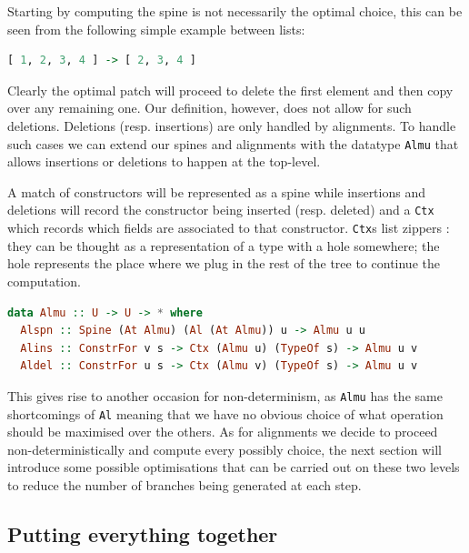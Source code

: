 \documentclass[11pt]{article}
\begin{document}
Starting by computing the spine is not necessarily the optimal choice, this can 
be seen from the following simple example between lists:

\begin{lstlisting}[language=haskell]
  [ 1, 2, 3, 4 ] -> [ 2, 3, 4 ]
\end{lstlisting}
Clearly the optimal patch will proceed to delete the first element and then 
copy over any remaining one. Our definition, however, does not allow for such 
deletions. Deletions (resp. insertions) are only handled by alignments. To 
handle such cases we can extend our spines and alignments with the datatype 
\texttt{Almu} that allows insertions or deletions to happen at the top-level.

A match of constructors will be represented as a spine while insertions and 
deletions will record the constructor being inserted (resp. deleted) and a 
\texttt{Ctx} which records which fields are associated to that constructor.
\texttt{Ctx}s list zippers \cite{zippers}: they can be thought as a representation 
of a type with a hole somewhere; the hole represents the place where we 
plug in the rest of the tree to continue the computation.
\begin{lstlisting}[language=haskell]
data Almu :: U -> U -> * where
  Alspn :: Spine (At Almu) (Al (At Almu)) u -> Almu u u
  Alins :: ConstrFor v s -> Ctx (Almu u) (TypeOf s) -> Almu u v
  Aldel :: ConstrFor u s -> Ctx (Almu v) (TypeOf s) -> Almu u v
\end{lstlisting}

This gives rise to another occasion for non-determinism, as \texttt{Almu} has 
the same shortcomings of \texttt{Al} meaning that we have no obvious choice of 
what operation should be maximised over the others. As for alignments we decide to proceed non-deterministically
and compute every possibly choice, the next section will introduce some possible optimisations 
that can be carried out on these two levels to reduce the number of branches 
being generated at each step.

\subsection{Putting everything together}\label{putting everything together}
\end{document}
